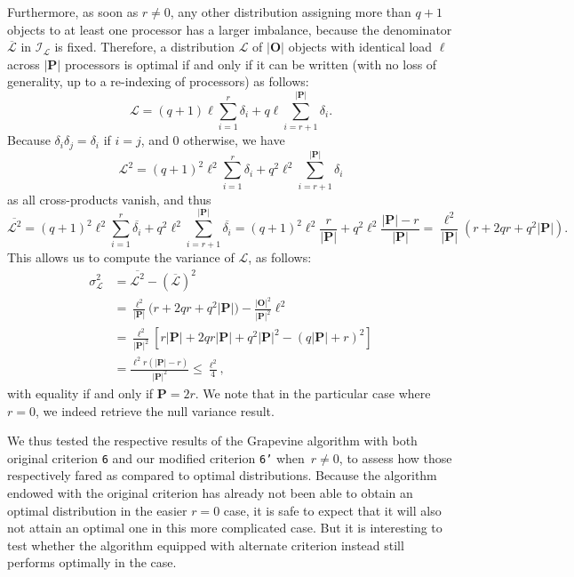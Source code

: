 Furthermore, as soon as $r\neq0$, any other distribution assigning
more than $q+1$ objects to at least one processor has
a larger imbalance, because the denominator
$\overline{\mathcal{L}}$ in $\mathcal{I}_{\mathcal{L}}$ is fixed.
Therefore, a distribution $\mathcal{L}$ of
$\vert\mathbf{O}\vert$ objects with identical load $\ell$ across
$\vert\mathbf{P}\vert$ processors is optimal if and only if it can be
written (with no loss of generality, up to a re-indexing of
processors) as follows:
\[
\mathcal{L}=
(q+1)\ell \sum_{i=1}^{r}\delta_i
+ q\ell\!\sum_{i=r+1}^{\vert{\mathbf{P}}\vert}\delta_i.
\]
Because $\delta_i\delta_j=\delta_i$ if $i=j$, and $0$ otherwise, we have
\[
\mathcal{L}^2=
(q+1)^2\ell^2\sum_{i=1}^{r}\delta_i
+ q^2\ell^2\sum_{i=r+1}^{\vert{\mathbf{P}}\vert}\delta_i
\]
as all cross-products vanish, and thus
\[
\overline{\mathcal{L}^2}=
(q+1)^2\ell^2\sum_{i=1}^{r}\overline{\delta_i}
+ q^2\ell^2\sum_{i=r+1}^{\vert{\mathbf{P}}\vert}\overline{\delta_i}
= (q+1)^2\ell^2\frac{r}{\vert{\mathbf{P}}\vert}
+ q^2\ell^2\frac{\vert{\mathbf{P}}\vert-r}{\vert{\mathbf{P}}\vert}
= \frac{\ell^2}{\vert{\mathbf{P}}\vert}
(r + 2qr + q^2\vert{\mathbf{P}}\vert).
\]
This allows us to compute the variance of $\mathcal{L}$, as follows:
\begin{align*}
\sigma_{\mathcal{L}}^2
&= \overline{\mathcal{L}^2} - (\overline{\mathcal{L}})^2\\
&= \frac{\ell^2}{\vert{\mathbf{P}}\vert}
\big(r + 2qr + q^2\vert{\mathbf{P}}\vert\big)
- \frac{\vert\mathbf{O}\vert^2}{\vert\mathbf{P}\vert^2}\ell^2\\
&= \frac{\ell^2}{\vert{\mathbf{P}}\vert^2}
\left[r\vert{\mathbf{P}}\vert + 2qr\vert{\mathbf{P}}\vert
+ q^2\vert{\mathbf{P}}\vert^2
- (q\vert{\mathbf{P}}\vert+r)^2\right]\\
&= \frac{\ell^2 r(\vert{\mathbf{P}}\vert - r)}
{\vert{\mathbf{P}}\vert^2}
\le \frac{\ell^2}{4},
\end{align*}
with equality if and only if $\mathbf{P}=2r$.
We note that in the particular case where $r=0$, we indeed retrieve
the null variance result.

We thus tested the respective results of the Grapevine algorithm with
both original criterion \texttt{6} and our modified criterion
\texttt{6'} when~$r\neq0$, to assess how those respectively fared as
compared to optimal distributions.
Because the algorithm endowed with the original criterion has already
not been able to obtain an optimal distribution in the easier $r=0$
case, it is safe to expect that it will also not attain an optimal one
in this more complicated case. But it is interesting to test whether
the algorithm equipped with alternate criterion instead still performs
optimally in the case.

